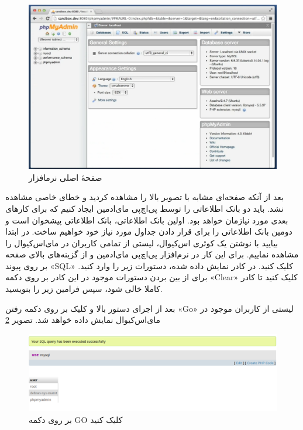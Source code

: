  \begin{figure}
     \includegraphics[width=.9\textwidth ,height=.65\textwidth]{Pic/PHPMYADMIN-UI}
     \caption{ صفحهٔ اصلی نرمافزار  
        }
        \label{PHPMyAdmin5}
    \end{figure}
    بعد از آنکه صفحه‌ای مشابه با تصویر بالا را مشاهده کردید و خطای خاصی مشاهده نشد. باید دو بانک اطلاعاتی را توسط پی‌اچ‌پی مای‌ادمین ایجاد کنیم که برای کارهای بعدی مورد نیازمان خواهد بود. اولین بانک اطلاعاتی، بانک اطلاعاتی پیشخوان است و دومین بانک اطلاعاتی را برای قرار دادن جداول مورد نیاز خود خواهیم ساخت. در ابتدا بیایید با نوشتن یک کوئری اس‌کیوال، لیستی از تمامی کاربران در مای‌اس‌کیوال را مشاهده نماییم. برای این کار در نرم‌افزار پی‌اچ‌پی مای‌ادمین و از گزینه‌های بالای صفحه بر روی پیوند «SQL» کلیک کنید. در کادر نمایش داده شده، دستورات زیر را وارد کنید. برای از بین بردن دستورات موجود در این کادر بر روی دکمه «Clear» کلیک کنید تا کادر کاملا خالی شود، سپس فرامین زیر را بنویسید.
    
\begin{latin}  
    
\end{latin}

بعد از اجرای دستور بالا و کلیک بر روی دکمه رفتن «Go» لیستی از کاربران موجود در مای‌اس‌کیوال نمایش داده خواهد شد. تصویر \ref{GO-USERS}
 \begin{figure}
     \includegraphics[width=.9\textwidth ,height=.35\textwidth]{Pic/SQL-USER-GO}
     \caption{ بر روی دکمه GO کلیک کنید 
        }
        \label{GO-USERS}
    \end{figure}

